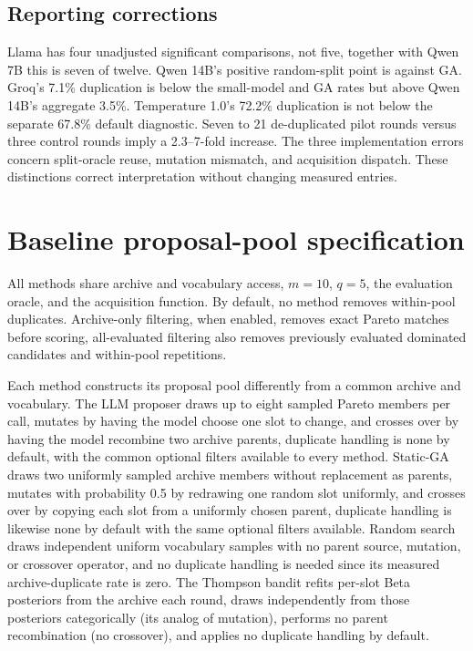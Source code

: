 \subsection{Reporting corrections}
Llama has four unadjusted significant comparisons, not five, together with Qwen 7B this is seven of twelve. Qwen 14B's positive random-split point is against GA. Groq's 7.1\% duplication is below the small-model and GA rates but above Qwen 14B's aggregate 3.5\%. Temperature 1.0's 72.2\% duplication is not below the separate 67.8\% default diagnostic. Seven to 21 de-duplicated pilot rounds versus three control rounds imply a 2.3--7-fold increase. The three implementation errors concern split-oracle reuse, mutation mismatch, and acquisition dispatch. These distinctions correct interpretation without changing measured entries.

\section{Baseline proposal-pool specification}
\label{app:baselines}
All methods share archive and vocabulary access, $m=10$, $q=5$, the evaluation oracle, and the acquisition function. By default, no method removes within-pool duplicates. Archive-only filtering, when enabled, removes exact Pareto matches before scoring, all-evaluated filtering also removes previously evaluated dominated candidates and within-pool repetitions.

Each method constructs its proposal pool differently from a common archive and vocabulary. The LLM proposer draws up to eight sampled Pareto members per call, mutates by having the model choose one slot to change, and crosses over by having the model recombine two archive parents, duplicate handling is none by default, with the common optional filters available to every method. Static-GA draws two uniformly sampled archive members without replacement as parents, mutates with probability 0.5 by redrawing one random slot uniformly, and crosses over by copying each slot from a uniformly chosen parent, duplicate handling is likewise none by default with the same optional filters available. Random search draws independent uniform vocabulary samples with no parent source, mutation, or crossover operator, and no duplicate handling is needed since its measured archive-duplicate rate is zero. The Thompson bandit refits per-slot Beta posteriors from the archive each round, draws independently from those posteriors categorically (its analog of mutation), performs no parent recombination (no crossover), and applies no duplicate handling by default.


